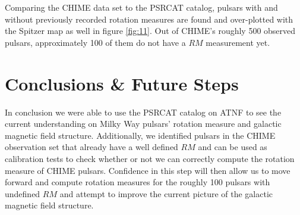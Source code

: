 \documentclass[12pt]{article}
\begin{document}
    \\
    \\
    Comparing the CHIME data set to the PSRCAT catalog, pulsars with and without previously recorded rotation measures are found and over-plotted with the Spitzer map as well in figure \eqref{fig:11}. Out of CHIME's roughly 500 observed pulsars, approximately 100 of them do not have a $RM$ measurement yet.
    
\section{Conclusions \& Future Steps}
    In conclusion we were able to use the PSRCAT catalog on ATNF to see the current understanding on Milky Way pulsars' rotation measure and galactic magnetic field structure. Additionally, we identified pulsars in the CHIME observation set that already have a well defined $RM$ and can be used as calibration tests to check whether or not we can correctly compute the rotation measure of CHIME pulsars. Confidence in this step will then allow us to move forward and compute rotation measures for the roughly 100 pulsars with undefined $RM$ and attempt to improve the current picture of the galactic magnetic field structure.
\end{document}

